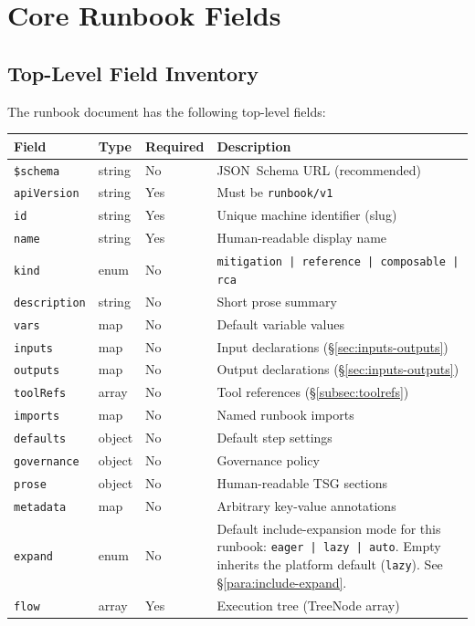 \section{Core Runbook Fields}
\label{sec:core-fields}

\subsection{Top-Level Field Inventory}
\label{subsec:field-inventory}

The runbook document has the following top-level fields:

\begin{center}
\begin{tabular}{lllp{5.5cm}}
\hline
\textbf{Field} & \textbf{Type} & \textbf{Required} & \textbf{Description} \\
\hline
\texttt{\$schema}     & string  & No  & JSON~Schema URL (recommended) \\
\texttt{apiVersion}   & string  & Yes & Must be \texttt{runbook/v1} \\
\texttt{id}           & string  & Yes & Unique machine identifier (slug) \\
\texttt{name}         & string  & Yes & Human-readable display name \\
\texttt{kind}         & enum    & No  & \texttt{mitigation | reference | composable | rca} \\
\texttt{description}  & string  & No  & Short prose summary \\
\texttt{vars}         & map     & No  & Default variable values \\
\texttt{inputs}       & map     & No  & Input declarations (\S\ref{sec:inputs-outputs}) \\
\texttt{outputs}      & map     & No  & Output declarations (\S\ref{sec:inputs-outputs}) \\
\texttt{toolRefs}     & array   & No  & Tool references (\S\ref{subsec:toolrefs}) \\
\texttt{imports}      & map     & No  & Named runbook imports \\
\texttt{defaults}     & object  & No  & Default step settings \\
\texttt{governance}   & object  & No  & Governance policy \\
\texttt{prose}        & object  & No  & Human-readable TSG sections \\
\texttt{metadata}     & map     & No  & Arbitrary key-value annotations \\
\texttt{expand}       & enum    & No  & Default include-expansion mode for this runbook: \texttt{eager | lazy | auto}. Empty inherits the platform default (\texttt{lazy}). See \S\ref{para:include-expand}. \\
\texttt{flow}         & array   & Yes & Execution tree (TreeNode array) \\
\hline
\end{tabular}
\end{center}

